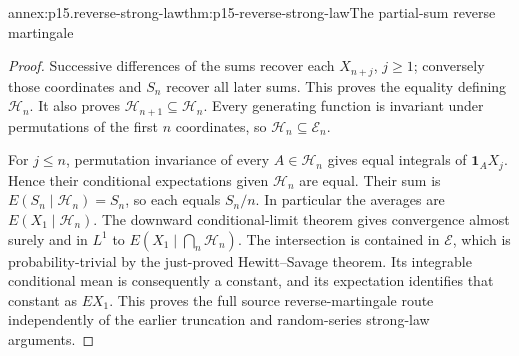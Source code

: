 \begin{annexitem}{annex:p15.reverse-strong-law}{thm:p15-reverse-strong-law}{The partial-sum reverse martingale}
\begin{proof}
Successive differences of the sums recover each \(X_{n+j}\), \(j\geq1\);
conversely those coordinates and \(S_n\) recover all later sums.
This proves the equality defining \(\mathcal H_n\).
It also proves \(\mathcal H_{n+1}\subseteq\mathcal H_n\).
Every generating function is invariant under permutations of the first
\(n\) coordinates, so \(\mathcal H_n\subseteq\mathcal E_n\).

For \(j\leq n\), permutation invariance of every
\(A\in\mathcal H_n\) gives equal integrals of
\(\mathbf1_A X_j\). Hence their conditional expectations given
\(\mathcal H_n\) are equal. Their sum is
\(E(S_n\mid\mathcal H_n)=S_n\), so each equals \(S_n/n\).
In particular the averages are \(E(X_1\mid\mathcal H_n)\).
The downward conditional-limit theorem gives convergence almost surely
and in \(L^1\) to \(E(X_1\mid\bigcap_n\mathcal H_n)\).
The intersection is contained in \(\mathcal E\), which is
probability-trivial by the just-proved Hewitt--Savage theorem.
Its integrable conditional mean is consequently a constant, and its
expectation identifies that constant as \(EX_1\).
This proves the full source reverse-martingale route independently
of the earlier truncation and random-series strong-law arguments.
\end{proof}
\end{annexitem}

